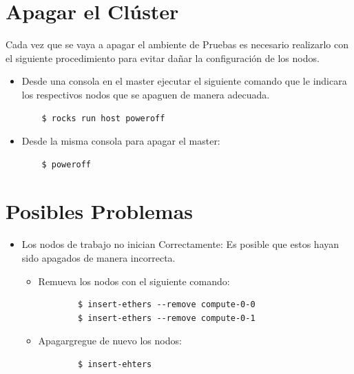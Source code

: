 \section{Apagar el Clúster}

Cada vez que se vaya a apagar el ambiente de Pruebas es necesario realizarlo con el siguiente procedimiento para evitar dañar la configuración de los nodos. 

\begin{itemize}
	\item Desde una consola en el master ejecutar el siguiente comando que le indicara los respectivos nodos que se apaguen de manera adecuada. 

	 \begin{verbatim}
	$ rocks run host poweroff
 	\end{verbatim}

 	\item Desde la misma consola para apagar el master: 

 	\begin{verbatim}
 	$ poweroff
 	\end{verbatim}
 	
  
\end{itemize}



\section{Posibles Problemas}

\begin{itemize}

	\item Los nodos de trabajo no inician Correctamente: Es posible que estos hayan sido apagados de manera incorrecta. 

	\begin{itemize}
		\item Remueva los nodos con el siguiente comando: 


		\begin{verbatim}
		$ insert-ethers --remove compute-0-0
		$ insert-ethers --remove compute-0-1
		\end{verbatim}

		\item Apagargregue de nuevo los nodos: 


		\begin{verbatim}
		$ insert-ehters
		\end{verbatim}
		
		
	\end{itemize}


\end{itemize}





